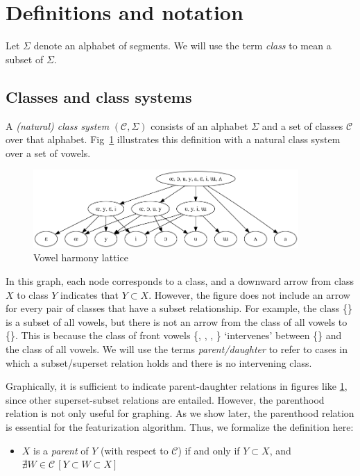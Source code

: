 \documentclass[11pt, oneside]{article}   	%
\begin{document}
\section{Definitions and notation}

Let $\Sigma$ denote an alphabet of segments. We will use the term \textit{class} to mean a subset of $\Sigma$.

\subsection{Classes and class systems}

A \textit{(natural) class system} $(\mathcal C, \Sigma)$ consists of an alphabet $\Sigma$ and a set of classes $\mathcal C$ over that alphabet. Fig~\ref{fig:lattice} illustrates this definition with a natural class system over a set of vowels.

\begin{figure}[h]
\includegraphics[width=0.9\textwidth]{vowelHarmony_unicode.png}
\caption{Vowel harmony lattice}
\label{fig:lattice}
\end{figure}

In this graph, each node corresponds to a class, and a downward arrow from class $X$ to class $Y$ indicates that $Y \subset X$. However, the figure does not include an arrow for every pair of classes that have a subset relationship. For example, the class \{\} is a subset of all vowels, but there is not an arrow from the class of all vowels to \{\}. This is because the class of front vowels \{\textipa{\oe}, , , \} `intervenes' between \{\} and the class of all vowels. We will use the terms \textit{parent/daughter} to refer to cases in which a subset/superset relation holds and there is no intervening class.

Graphically, it is sufficient to indicate parent-daughter relations in figures like \ref{fig:lattice}, since other superset-subset relations are entailed. However, the parenthood relation is not only useful for graphing. As we show later, the parenthood relation is essential for the featurization algorithm. Thus, we formalize the definition here: \begin{itemize}
    \item $X$ is a \textit{parent} of $Y$ (with respect to $\mathcal C$) if and only if $Y \subset X$, and $\nexists W \in \mathcal C \, [Y \subset W \subset X]$
    \end{itemize}
\end{document}
